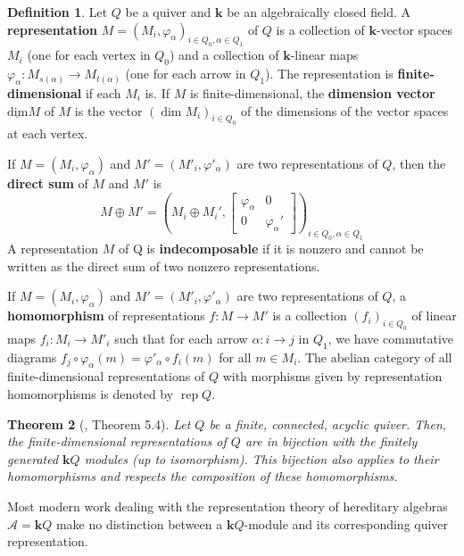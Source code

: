 \documentclass[11pt]{amsart}
\theoremstyle{plain}
\newtheorem{theorem}{Theorem}[section]
\theoremstyle{definition}
\newtheorem{definition}[theorem]{Definition}
\numberwithin{equation}{section}
\renewcommand{\k}{\mathbf{k}}
\newcommand{\udim}{\operatorname{\underline{dim}}}
\begin{document}
\begin{definition}
    Let $Q$ be a quiver and $\k$ be an algebraically closed field.
    A \textbf{representation} $M = (M_i, \varphi_\alpha)_{i \in Q_0, \alpha \in Q_1}$ of $Q$ is a collection of $\k$-vector spaces $M_i$ (one for each vertex in $Q_0$) and a collection of $\k$-linear maps $\varphi_\alpha: M_{s(\alpha)} \to M_{t(\alpha)}$ (one for each arrow in $Q_1$).
    The representation is \textbf{finite-dimensional} if each $M_i$ is. 
    If $M$ is finite-dimensional, the \textbf{dimension vector} $\udim M$ of $M$ is the vector $(\dim M_i)_{i \in Q_0}$ of the dimensions of the vector spaces at each vertex.

    If $M = (M_i, \varphi_\alpha)$ and $M' = (M'_i, \varphi'_\alpha)$ are two representations of $Q$, then the \textbf{direct sum} of $M$ and $M'$ is \[ M \oplus M' = \left( M_i \oplus M_i', \begin{bmatrix}
        \varphi_\alpha & 0 \\
        0 & \varphi_\alpha'
    \end{bmatrix} \right)_{i \in Q_0, \alpha \in Q_1} \] A representation $M$ of Q is \textbf{indecomposable} if it is nonzero and cannot be written as the direct sum of two nonzero representations.

    If $M = (M_i, \varphi_\alpha)$ and $M' = (M'_i, \varphi'_\alpha)$ are two representations of $Q$, a \textbf{homomorphism} of representations $f: M \to M'$ is a collection $(f_i)_{i\in Q_0}$ of linear maps $f_i: M_i \to M'_i$ such that for each arrow $\alpha: i \to j$ in $Q_1$, we have commutative diagrams $f_j \circ \varphi_\alpha(m) = \varphi'_\alpha \circ f_i(m)$ for all $m\in M_i$.
    The abelian category of all finite-dimensional representations of $Q$ with morphisms given by representation homomorphisms is denoted by $\operatorname{rep} Q$.
\end{definition}

\begin{theorem}[\cite{schiffler_quiver_2014}, Theorem 5.4]\label{reps-modules}
    Let $Q$ be a finite, connected, acyclic quiver. 
    Then, the finite-dimensional representations of $Q$ are in bijection with the finitely generated $\k Q$ modules (up to isomorphism). 
    This bijection also applies to their homomorphisms and respects the composition of these homomorphisms.
\end{theorem}

Most modern work dealing with the representation theory of hereditary algebras $\mathcal{A} = \k Q$ make no distinction between a $\k Q$-module and its corresponding quiver representation.
\end{document}
